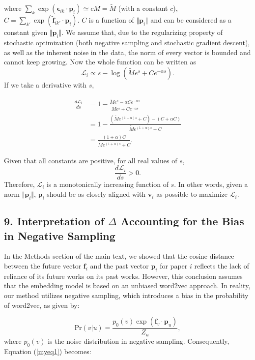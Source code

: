 \documentclass[12pt]{article}
\begin{document}
\begin{refsection}
where $\sum_k \exp(\mathbf{\epsilon}_{ik} \cdot \mathbf{p}_i) \simeq cM = \tilde{M}$ (with a constant $c$), $C = \sum_{k'} \exp(\tilde{\mathbf{f}}_{ik'} \cdot \mathbf{p}_i)$. $C$ is a function of $\Vert \mathbf{p}_i \Vert$ and can be considered as a constant given $\Vert \mathbf{p}_i \Vert$. We assume that, due to the regularizing property of stochastic optimization (both negative sampling and stochastic gradient descent), as well as the inherent noise in the data, the norm of every vector is bounded and cannot keep growing.  Now the whole function can be written as $$\mathcal{L}_i \propto s - \log (\tilde{M} e^s + C e^{-\alpha s}).$$ If we take a derivative with $s$,

$$\begin{aligned}
\frac{d \mathcal{L}_i}{d s} &= 1 - \frac{\tilde{M} e^s - \alpha C e^{-\alpha s}}{\tilde{M} e^s + C e^{-\alpha s} }\\
&=1 - \frac{(\tilde{M} e^{(1+\alpha)s} + C) - (C + \alpha C)}{\tilde{M} e^{(1+\alpha)s} + C} \\
&=\frac{(1+\alpha)C}{\tilde{M} e^{(1 + \alpha)s} + C}
.\end{aligned}$$ 


Given that all constants are positive, for all real values of $s$, $$\frac{d \mathcal{L}_i}{d s} > 0.$$ Therefore, $\mathcal{L}_i$ is a monotonically increasing function of $s$. In other words, given a norm $\Vert \mathbf{p}_i \Vert$, $\mathbf{p}_i$ should be as closely aligned with $\mathbf{v}_i$ as possible to maximize $\mathcal{L}_i$. 







\subsection*{9. Interpretation of $\Delta$ Accounting for the Bias in Negative Sampling}



In the Methods section of the main text, we showed that the cosine distance between the future vector $\mathbf{f}_i$ and the past vector $\mathbf{p}_i$ for paper $i$ reflects the lack of reliance of its future works on its past works. However, this conclusion assumes that the embedding model is based on an unbiased word2vec approach. In reality, our method utilizes negative sampling, which introduces a bias in the probability of word2vec, as given by:

\[
\text{Pr}(v|u) = \frac{ p_0(v) \exp(\mathbf{f}_v \cdot \mathbf{p}_u)}{Z_u},
\]
where $p_0(v)$ is the noise distribution in negative sampling. Consequently, Equation (\ref{myeq1}) becomes:


\end{refsection}
\end{document}
